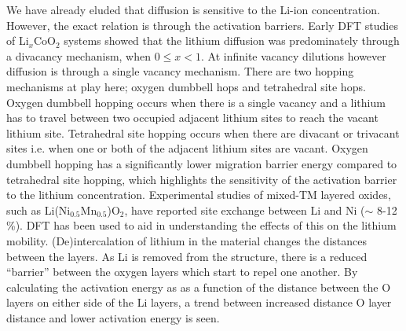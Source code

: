 \documentclass[../main.tex]{subfiles}
\begin{document}
We have already eluded that diffusion is sensitive to the Li-ion concentration. However, the exact relation is through the activation barriers. Early DFT studies \cite{van2000lithium,van2001lithium} of Li$_x$CoO$_2$ systems showed that the lithium diffusion was predominately through a divacancy mechanism, when $0\leq x < 1$. At infinite vacancy dilutions however diffusion is through a single vacancy mechanism. \cite{islam2014lithium} There are two hopping mechanisms at play here; oxygen dumbbell hops and tetrahedral site hops. Oxygen dumbbell hopping occurs when there is a single vacancy and a lithium has to travel between two occupied adjacent lithium sites to reach the vacant lithium site. Tetrahedral site hopping occurs when there are divacant or trivacant sites i.e.  when one or both of the adjacent lithium sites are vacant. \cite{van2001lithium} Oxygen dumbbell hopping has a significantly lower migration barrier energy compared to tetrahedral site hopping, which highlights the sensitivity of the activation barrier to the lithium concentration. Experimental studies of mixed-TM layered oxides, such as Li(Ni$_{0.5}$Mn$_{0.5}$)O$_2$, have reported site exchange between Li and Ni ($\sim$ 8-12 \%). \cite{choi2005structural} DFT has been used to aid in understanding the effects of this on the lithium mobility. \cite{kang2006electrodes,laubach2009structure} (De)intercalation of lithium in the material changes the distances between the layers. As Li is removed from the structure, there is a reduced ``barrier'' between the oxygen layers which start to repel one another. By calculating the activation energy as as a function of the distance between the O layers on either side of the Li layers, a trend between increased distance O layer distance and lower activation energy is seen. \cite{kang2006electrodes,laubach2009structure}
\end{document}
